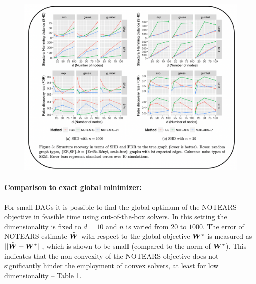 \documentclass[11pt,a4paper]{article}
\begin{document}
\begin{figure}[h]
\center
\includegraphics[width=16cm]{figures/fig3.png}
\label{fig:fig3}
\end{figure}


\paragraph{Comparison to exact global minimizer:} For small DAGs it is possible to find the global optimum of the NOTEARS objective in feasible time using out-of-the-box solvers.
In this setting the dimensionality is fixed to $d=10$ and $n$ is varied from $20$ to $1000$.
The error of NOTEARS estimate $\tilde{{\bm{W}}}$ with respect to the global objective ${\bm{W}}^\star$ is measured as $||\tilde{{\bm{W}}} - {\bm{W}}^\star||$, which is shown to be small (compared to the norm of ${\bm{W}}^\star$).
This indicates that the non-convexity of the NOTEARS objective does not significantly hinder the employment of convex solvers, at least for low dimensionality -- Table 1. 
\end{document}

